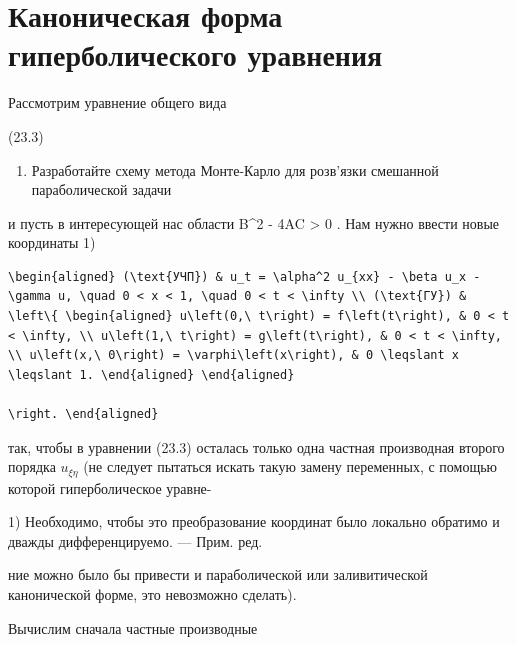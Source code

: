 \documentclass[
]{article}
\providecommand{\tightlist}{%
  \setlength{\itemsep}{0pt}\setlength{\parskip}{0pt}}
\begin{document}
\section{Каноническая форма гиперболического
уравнения}\label{ux43aux430ux43dux43eux43dux438ux447ux435ux441ux43aux430ux44f-ux444ux43eux440ux43cux430-ux433ux438ux43fux435ux440ux431ux43eux43bux438ux447ux435ux441ux43aux43eux433ux43e-ux443ux440ux430ux432ux43dux435ux43dux438ux44f}

Рассмотрим уравнение общего вида

(23.3)

\begin{enumerate}
\def\labelenumi{\arabic{enumi}.}
\setcounter{enumi}{4}
\tightlist
\item
  Разработайте схему метода Монте-Карло для розв'язки смешанной
  параболической задачи
\end{enumerate}

и пусть в интересующей нас области B\^{}2 - 4AC \textgreater{} 0 . Нам
нужно ввести новые координаты 1)

\begin{verbatim}
\begin{aligned} (\text{УЧП}) & u_t = \alpha^2 u_{xx} - \beta u_x - \gamma u, \quad 0 < x < 1, \quad 0 < t < \infty \\ (\text{ГУ}) & \left\{ \begin{aligned} u\left(0,\ t\right) = f\left(t\right), & 0 < t < \infty, \\ u\left(1,\ t\right) = g\left(t\right), & 0 < t < \infty, \\ u\left(x,\ 0\right) = \varphi\left(x\right), & 0 \leqslant x \leqslant 1. \end{aligned} \end{aligned}

\right. \end{aligned}
\end{verbatim}

так, чтобы в уравнении (23.3) осталась только одна частная производная
второго порядка \(u_{\xi\eta}\) (не следует пытаться искать такую замену
переменных, с помощью которой гиперболическое уравне-

1) Необходимо, чтобы это преобразование координат было локально обратимо
и дважды дифференцируемо. --- Прим. ред.

ние можно было бы привести и параболической или заливитической
канонической форме, это невозможно сделать).

Вычислим сначала частные производные
\end{document}
